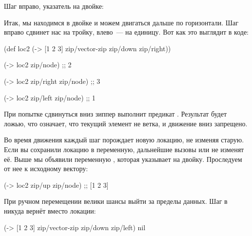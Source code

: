 \begin{figure}[H]
  \centering
  
  \label{fig:chart-zip-02}
\end{figure}

\pagebreaklarge

Шаг вправо, указатель на двойке:

\begin{figure}[H]
  \centering
  
  \label{fig:chart-zip-03}
\end{figure}

Итак, мы находимся в двойке и можем двигаться дальше по горизонтали. Шаг вправо
сдвинет нас на тройку, влево~--- на единицу. Вот как это выглядит в коде:

\begin{english}
  \begin{clojure}
(def loc2
  (-> [1 2 3]
      zip/vector-zip
      zip/down
      zip/right))

(-> loc2 zip/node)           ;; 2

(-> loc2 zip/right zip/node) ;; 3

(-> loc2 zip/left zip/node)  ;; 1
  \end{clojure}
\end{english}

При попытке сдвинуться вниз зиппер выполнит предикат . Результат
будет ложью, что означает, что текущий элемент не ветка, и движение вниз
запрещено.

Во время движения каждый шаг порождает новую локацию, не изменяя старую. Если вы
сохранили локацию в переменную, дальнейшие вызовы  или
 не изменят её. Выше мы объявили переменную , которая
указывает на двойку. Проследуем от нее к исходному вектору:

\begin{english}
  \begin{clojure}
(-> loc2 zip/up zip/node)
;; [1 2 3]
  \end{clojure}
\end{english}

\pagebreaklarge

При ручном перемещении велики шансы выйти за пределы данных. Шаг в никуда вернёт
 вместо локации:

\begin{english}
  \begin{clojure}
(-> [1 2 3]
    zip/vector-zip
    zip/down
    zip/left)
nil
  \end{clojure}
\end{english}

